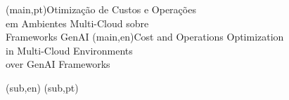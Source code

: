 
%




%
%
%
%
\nttitle(main,pt){Otimização de Custos e Operações\\em Ambientes Multi-Cloud sobre\\Frameworks GenAI}%
\nttitle(main,en){Cost and Operations Optimization\\in Multi-Cloud Environments\\over GenAI Frameworks}%

\nttitle(sub,en){}%
\nttitle(sub,pt){}%



%
%
%
%




